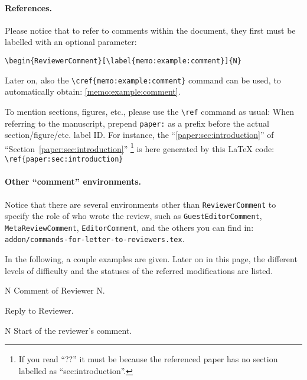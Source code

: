 \begin{Answer}
\begin{sloppypar}
\paragraph{References.}
Please notice that to refer to comments within the document, they first must be labelled with an optional parameter:
\begin{verbatim}
\begin{ReviewerComment}[\label{memo:example:comment}]{N}
\end{verbatim}
Later on, also the \verb|\cref{memo:example:comment}| command can be used, to automatically obtain: \cref{memo:example:comment}.

To mention sections, figures, etc., please use the \verb|\ref| command as usual: When referring to the manuscript, prepend \verb|paper:| as a prefix before the actual section/figure/etc. label ID. For instance, the ``\ref{paper:sec:introduction}'' of ``Section~\ref{paper:sec:introduction}''%
\footnote{If you read ``??'' it must be because the referenced paper has no section labelled as ``sec:introduction''.}
is here generated by this {\LaTeX} code:
\verb|\ref{paper:sec:introduction}|
%
%
\paragraph{Other ``comment'' environments.}
Notice that there are several environments other than \verb|ReviewerComment| to specify the role of who wrote the review, such as \verb|GuestEditorComment|, \verb|MetaReviewComment|, \verb|EditorComment|, and the others you can find in:\\
\texttt{addon/commands-for-letter-to-reviewers.tex}.
\end{sloppypar}
In the following, a couple examples are given. Later on in this page, the different levels of difficulty and the statuses of the referred modifications are listed.
\end{Answer}
%
%
\begin{ReviewerComment}{N}
	Comment of Reviewer N.
\end{ReviewerComment}
%
\begin{Answer}
	Reply to Reviewer.
	 \NotEstimatedRevTask
\end{Answer}
%
%
\begin{ReviewerComment}{N}
Start of the reviewer's comment.
\end{ReviewerComment}
